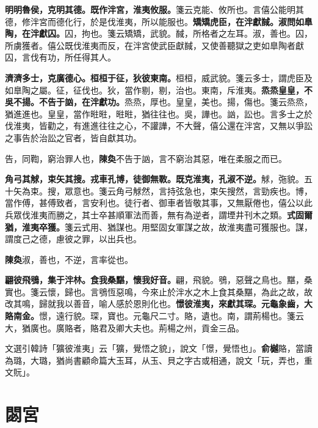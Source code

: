 \textbf{明明魯侯，克明其德。既作泮宮，淮夷攸服。}{\footnotesize 箋云克能、攸所也。言僖公能明其德，修泮宮而德化行，於是伐淮夷，所以能服也。}\textbf{矯矯虎臣，在泮獻馘。淑問如臯陶，在泮獻囚。}{\footnotesize 囚，拘也。箋云矯矯，武貌。馘，所格者之左耳。淑，善也。囚，所虜獲者。僖公既伐淮夷而反，在泮宮使武臣獻馘，又使善聽獄之吏如臯陶者獻囚，言伐有功，所任得其人。}

\textbf{濟濟多士，克廣德心。桓桓于征，狄彼東南。}{\footnotesize 桓桓，威武貌。箋云多士，謂虎臣及如臯陶之屬。征，征伐也。狄，當作剔，剔，治也。東南，斥淮夷。}\textbf{烝烝皇皇，不吳不揚。不告于訩，在泮獻功。}{\footnotesize 烝烝，厚也。皇皇，美也。揚，傷也。箋云烝烝，猶進進也。皇皇，當作暀暀，暀暀，猶往往也。吳，譁也。訩，訟也。言多士之於伐淮夷，皆勸之，有進進往往之心，不讙譁，不大聲，僖公還在泮宮，又無以爭訟之事告於治訟之官者，皆自獻其功。}

\begin{quoting}告，同鞫，窮治罪人也，\textbf{陳奐}不告于訩，言不窮治其惡，唯在柔服之而已。\end{quoting}

\textbf{角弓其觩，束矢其搜。戎車孔博，徒御無斁。既克淮夷，孔淑不逆。}{\footnotesize 觩，㢮貌。五十矢為束。搜，眾意也。箋云角弓觩然，言持弦急也，束矢搜然，言勁疾也。博，當作傅，甚傅致者，言安利也。徒行者、御車者皆敬其事，又無厭倦也，僖公以此兵眾伐淮夷而勝之，其士卒甚順軍法而善，無有為逆者，謂堙井刊木之類。}\textbf{式固爾猶，淮夷卒獲。}{\footnotesize 箋云式用、猶謀也。用堅固女軍謀之故，故淮夷盡可獲服也。謀，謂度己之德，慮彼之罪，以出兵也。}

\begin{quoting}\textbf{陳奐}淑，善也，不逆，言率從也。\end{quoting}

\textbf{翩彼飛鴞，集于泮林。食我桑黮，懷我好音。}{\footnotesize 翩，飛貌。鴞，惡聲之鳥也。黮，桑實也。箋云懷，歸也。言鴞恆惡鳴，今來止於泮水之木上食其桑黮，為此之故，故改其鳴，歸就我以善音，喻人感於恩則化也。}\textbf{憬彼淮夷，來獻其琛。元龜象齒，大賂南金。}{\footnotesize 憬，遠行貌。琛，寶也。元龜尺二寸。賂，遺也。南，謂荊楊也。箋云大，猶廣也。廣賂者，賂君及卿大夫也。荊楊之州，貢金三品。}

\begin{quoting}文選引韓詩「獷彼淮夷」云「獷，覺悟之貌」，說文「憬，覺悟也」。\textbf{俞樾}賂，當讀為璐，大璐，猶尚書顧命篇大玉耳，从玉、貝之字古或相通，說文「玩，弄也，重文貦」。\end{quoting}

\section{閟宮}

